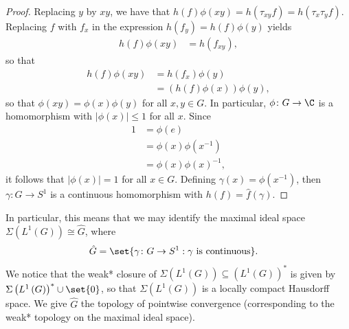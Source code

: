 \documentclass[10pt]{mypackage}
\begin{document}
\begin{proof}
  Replacing $y$ by $xy$, we have that $h(f)\phi\left( xy \right) = h\left( \tau_{xy}f \right) = h\left( \tau_x\tau_yf \right)$. Replacing $f$ with $f_x$ in the expression $h\left( f_y \right) = h(f)\phi(y)$ yields 
  \begin{align*}
    h(f)\phi\left( xy \right) &= h\left( f_{xy} \right),
  \end{align*}
  so that
  \begin{align*}
    h(f)\phi\left( xy \right) &= h\left( f_x \right)\phi(y)\\
                              &= \left( h(f)\phi(x) \right)\phi(y),
  \end{align*}
  so that $\phi(xy) = \phi(x)\phi(y)$ for all $x,y\in G$. In particular, $\phi\colon G\to \C$ is a homomorphism with $\left\vert \phi(x) \right\vert \leq 1$ for all $x$. Since
  \begin{align*}
    1 &= \phi(e)\\
      &= \phi(x)\phi\left( x^{-1} \right)\\
      &= \phi(x)\phi(x)^{-1},
  \end{align*}
  it follows that $\left\vert \phi(x) \right\vert = 1$ for all $x\in G$. Defining $\gamma(x) = \phi\left( x^{-1} \right)$, then $\gamma\colon G\to S^1$ is a continuous homomorphism with $h(f) = \hat{f}\left( \gamma \right)$.
\end{proof}
In particular, this means that we may identify the maximal ideal space $\Sigma\left( L^1\left( G \right) \right) \cong \hat{G}$, where 
\begin{align*}
  \hat{G} &= \set{\gamma\colon G\to S^1 : \gamma\text{ is continuous}}.
\end{align*}
We notice that the weak* closure of $\Sigma\left( L^1\left( G \right) \right)\subseteq \left( L^1\left( G \right) \right)^{\ast}$ is given by $\Sigma\left( L^1\left( G \right) \right)^{\ast}\cup \set{0}$, so that $\Sigma\left( L^1\left( G \right) \right)$ is a locally compact Hausdorff space. We give $\hat{G}$ the topology of pointwise convergence (corresponding to the weak* topology on the maximal ideal space).
\end{document}
